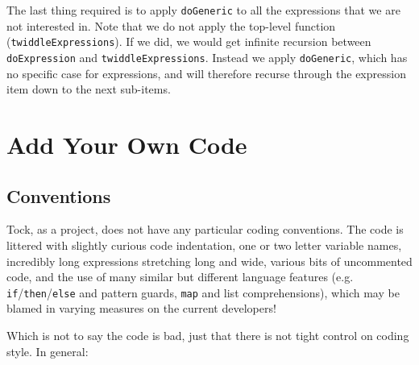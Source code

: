 \documentclass[a4wide]{article}
\begin{document}
The last thing required is to apply \lstinline|doGeneric| to all the expressions that we are not
interested in.  Note that we do not apply the top-level function (\lstinline|twiddleExpressions|).
If we did, we would get infinite recursion between \lstinline|doExpression| and \lstinline|twiddleExpressions|.
Instead we apply \lstinline|doGeneric|, which has no specific case for expressions, and will therefore recurse
through the expression item down to the next sub-items.

\section{Add Your Own Code}

\subsection{Conventions}

Tock, as a project, does not have any particular coding conventions.
The code is littered with slightly curious code indentation,
one or two letter variable names, incredibly long expressions stretching long and wide, various bits of
uncommented code, and the use of many similar but different language features (e.g. \lstinline|if|/\lstinline|then|/\lstinline|else| and
pattern guards, \lstinline|map| and list comprehensions), which may be blamed in varying measures on the current
developers!

Which is not to say the code is bad, just that there is not tight control on coding style.  In general:
\end{document}
